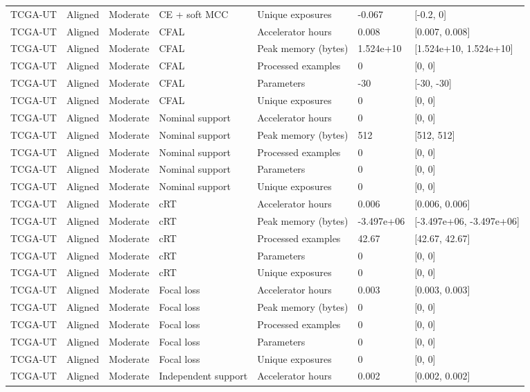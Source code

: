 \begin{longtable}{lllllll}
TCGA-UT & Aligned & Moderate & CE + soft MCC & Unique exposures & -0.067 & [-0.2, 0] \\
TCGA-UT & Aligned & Moderate & CFAL & Accelerator hours & 0.008 & [0.007, 0.008] \\
TCGA-UT & Aligned & Moderate & CFAL & Peak memory (bytes) & 1.524e+10 & [1.524e+10, 1.524e+10] \\
TCGA-UT & Aligned & Moderate & CFAL & Processed examples & 0 & [0, 0] \\
TCGA-UT & Aligned & Moderate & CFAL & Parameters & -30 & [-30, -30] \\
TCGA-UT & Aligned & Moderate & CFAL & Unique exposures & 0 & [0, 0] \\
TCGA-UT & Aligned & Moderate & Nominal support & Accelerator hours & 0 & [0, 0] \\
TCGA-UT & Aligned & Moderate & Nominal support & Peak memory (bytes) & 512 & [512, 512] \\
TCGA-UT & Aligned & Moderate & Nominal support & Processed examples & 0 & [0, 0] \\
TCGA-UT & Aligned & Moderate & Nominal support & Parameters & 0 & [0, 0] \\
TCGA-UT & Aligned & Moderate & Nominal support & Unique exposures & 0 & [0, 0] \\
TCGA-UT & Aligned & Moderate & cRT & Accelerator hours & 0.006 & [0.006, 0.006] \\
TCGA-UT & Aligned & Moderate & cRT & Peak memory (bytes) & -3.497e+06 & [-3.497e+06, -3.497e+06] \\
TCGA-UT & Aligned & Moderate & cRT & Processed examples & 42.67 & [42.67, 42.67] \\
TCGA-UT & Aligned & Moderate & cRT & Parameters & 0 & [0, 0] \\
TCGA-UT & Aligned & Moderate & cRT & Unique exposures & 0 & [0, 0] \\
TCGA-UT & Aligned & Moderate & Focal loss & Accelerator hours & 0.003 & [0.003, 0.003] \\
TCGA-UT & Aligned & Moderate & Focal loss & Peak memory (bytes) & 0 & [0, 0] \\
TCGA-UT & Aligned & Moderate & Focal loss & Processed examples & 0 & [0, 0] \\
TCGA-UT & Aligned & Moderate & Focal loss & Parameters & 0 & [0, 0] \\
TCGA-UT & Aligned & Moderate & Focal loss & Unique exposures & 0 & [0, 0] \\
TCGA-UT & Aligned & Moderate & Independent support & Accelerator hours & 0.002 & [0.002, 0.002] \\

\end{longtable}
